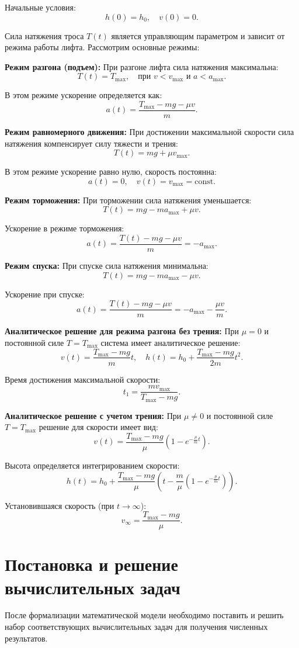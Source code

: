 \documentclass[a4paper, 14pt]{extarticle}
\begin{document}
Начальные условия:
\[
h(0) = h_0, \quad v(0) = 0.
\]

Сила натяжения троса $T(t)$ является управляющим параметром и зависит от режима работы лифта. Рассмотрим основные режимы:

\textbf{Режим разгона (подъем):}
При разгоне лифта сила натяжения максимальна:
\[
T(t) = T_{\max}, \quad \text{при } v < v_{\max} \text{ и } a < a_{\max}.
\]

В этом режиме ускорение определяется как:
\[
a(t) = \frac{T_{\max} - mg - \mu v}{m}.
\]

\textbf{Режим равномерного движения:}
При достижении максимальной скорости сила натяжения компенсирует силу тяжести и трения:
\[
T(t) = mg + \mu v_{\max}.
\]

В этом режиме ускорение равно нулю, скорость постоянна:
\[
a(t) = 0, \quad v(t) = v_{\max} = \text{const}.
\]

\textbf{Режим торможения:}
При торможении сила натяжения уменьшается:
\[
T(t) = mg - ma_{\max} + \mu v.
\]

Ускорение в режиме торможения:
\[
a(t) = \frac{T(t) - mg - \mu v}{m} = -a_{\max}.
\]

\textbf{Режим спуска:}
При спуске сила натяжения минимальна:
\[
T(t) = mg - ma_{\max} - \mu v.
\]

Ускорение при спуске:
\[
a(t) = \frac{T(t) - mg - \mu v}{m} = -a_{\max} - \frac{\mu v}{m}.
\]

\textbf{Аналитическое решение для режима разгона без трения:}
При $\mu = 0$ и постоянной силе $T = T_{\max}$ система имеет аналитическое решение:
\[
v(t) = \frac{T_{\max} - mg}{m}t, \quad h(t) = h_0 + \frac{T_{\max} - mg}{2m}t^2.
\]

Время достижения максимальной скорости:
\[
t_1 = \frac{m v_{\max}}{T_{\max} - mg}.
\]

\textbf{Аналитическое решение с учетом трения:}
При $\mu \ne 0$ и постоянной силе $T = T_{\max}$ решение для скорости имеет вид:
\[
v(t) = \frac{T_{\max} - mg}{\mu}\left(1 - e^{-\frac{\mu}{m}t}\right).
\]

Высота определяется интегрированием скорости:
\[
h(t) = h_0 + \frac{T_{\max} - mg}{\mu}\left(t - \frac{m}{\mu}\left(1 - e^{-\frac{\mu}{m}t}\right)\right).
\]

Установившаяся скорость (при $t \to \infty$):
\[
v_{\infty} = \frac{T_{\max} - mg}{\mu}.
\]

\section{Постановка и решение вычислительных задач}
После формализации математической модели необходимо поставить и решить набор соответствующих вычислительных задач для получения численных результатов.
\end{document}
